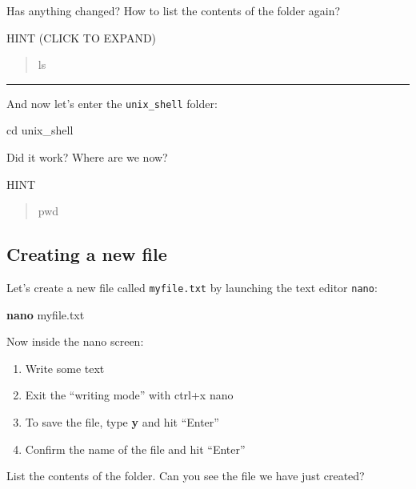 \documentclass[
]{book}
\newenvironment{Shaded}{\begin{snugshade}}{\end{snugshade}}
\newcommand{\BuiltInTok}[1]{#1}
\newcommand{\FunctionTok}[1]{\textcolor[rgb]{0.13,0.29,0.53}{\textbf{#1}}}
\newcommand{\NormalTok}[1]{#1}
\begin{document}
Has anything changed? How to list the contents of the folder again?

HINT (CLICK TO EXPAND)

\begin{quote}
ls
\end{quote}

\begin{center}\rule{0.5\linewidth}{0.5pt}\end{center}

And now let's enter the \texttt{unix\_shell} folder:

\begin{Shaded}
\begin{Highlighting}[]
\BuiltInTok{cd}\NormalTok{ unix\_shell}
\end{Highlighting}
\end{Shaded}

Did it work? Where are we now?

HINT

\begin{quote}
pwd
\end{quote}

\subsection{Creating a new file}\label{creating-a-new-file}

Let's create a new file called \texttt{myfile.txt} by launching the text editor \texttt{nano}:

\begin{Shaded}
\begin{Highlighting}[]
\FunctionTok{nano}\NormalTok{ myfile.txt}
\end{Highlighting}
\end{Shaded}

Now inside the nano screen:

\begin{enumerate}
\def\labelenumi{\arabic{enumi}.}
\item
  Write some text
\item
  Exit the ``writing mode'' with ctrl+x
  nano
\item
  To save the file, type \textbf{y} and hit ``Enter''
\item
  Confirm the name of the file and hit ``Enter''
\end{enumerate}

List the contents of the folder. Can you see the file we have just created?
\end{document}
